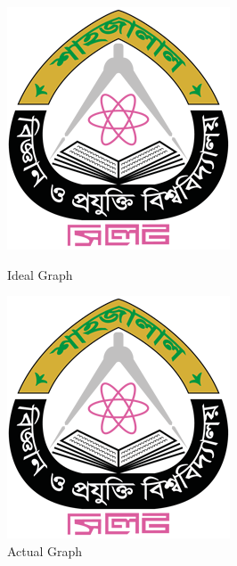 \begin{figure}[ht]
   \begin{minipage}{0.48\textwidth}
     \centering
     \includegraphics[width=.7\linewidth]{fig/SUST_Logo.png}
     \caption{Ideal Graph}\label{Fig:Data1}
   \end{minipage}\hfill
   \begin{minipage}{0.48\textwidth}
     \centering
     \includegraphics[width=.7\linewidth]{fig/SUST_Logo.png}
     \caption{Actual Graph}\label{Fig:Data2}
   \end{minipage}
\end{figure}